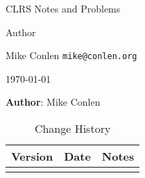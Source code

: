 \documentclass[oneside]{book}
\begin{document}
\fancyhf{} 
\renewcommand{\headrulewidth}{0pt}
\fancyfoot[C]{\thepage}

\frontmatter
\begin{titlepage}
	\vspace{1 in}
	\centering
	{\LARGE {CLRS Notes and Problems}\par}
	\vspace{1 cm}
	Author\par 
	Mike Conlen \texttt{mike@conlen.org}\par
	\vspace{1 cm}
	\today
\end{titlepage}

\thispagestyle{empty}
\textbf{Author}: Mike Conlen \\

\begin{table}[ht]
	\begin{tabular}{l l l}
		\toprule
		Version & Date & Notes \\
		\hline
		&& \\
		\bottomrule
	\end{tabular}
	\caption{Change History}\label{tab:history}
\end{table}

\tableofcontents
\lstlistoflistings
\end{document}
